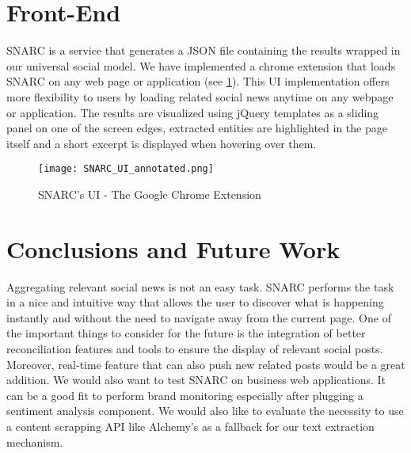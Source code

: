 
\section{Front-End}
SNARC is a service that generates a JSON file containing the results wrapped in our universal social model. We have implemented a chrome extension that loads SNARC on any web page or application (see \ref{fig:SNARC_UI_annotated}). This UI implementation offers more flexibility to users by loading related social news anytime on any webpage or application. The results are visualized using jQuery templates as a sliding panel on one of the screen edges, extracted entities are highlighted in the page itself and a short excerpt is displayed when hovering over them.

\begin{figure}[!ht]
  \centering
    \texttt{[image: SNARC\_UI\_annotated.png]}
  \caption{SNARC's UI - The Google Chrome Extension}
  \label{fig:SNARC_UI_annotated}
\end{figure}



\section{Conclusions and Future Work}

Aggregating relevant social news is not an easy task. SNARC performs the task in a nice and intuitive way that allows the user to discover what is happening instantly and without the need to navigate away from the current page. One of the important things to consider for the future is the integration of better reconciliation features and tools to ensure the display of relevant social posts. Moreover, real-time feature that can also push new related posts would be a great addition. We would also want to test SNARC on business web applications. It can be a good fit to perform brand monitoring especially after plugging a sentiment analysis component. We would also like to evaluate the necessity to use a content scrapping API like Alchemy’s as a fallback for our text extraction mechanism.

